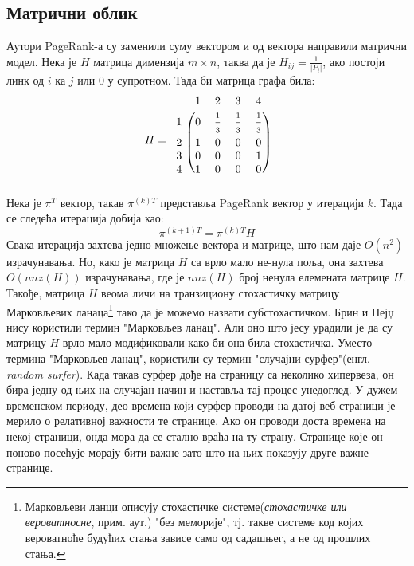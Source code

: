 \documentclass[11pt, serbianc, english, titlepage]{article}
\begin{document}
        \subsection{Матрични облик} 
		Аутори  PageRank-а су заменили суму вектором и од вектора направили матрични модел. Нека је $H$ матрица димензија $m\times n$, таква да је $H_{ij}=\frac{1}{\left |P_{i}  \right |}$, ако постоји линк од $i$ ка $j$ или $0$ у супротном. Тада би матрица графа била: 
\[
H=
\begin{blockarray}{ccccc}
& 1 & 2 & 3 & 4  \\
\begin{block}{c(cccc)}
  1 & 0 & \frac{\strut 1}{\strut 3} & \frac{\strut 1}{\strut 3} & \frac{\strut 1}{\strut 3}  \\
  2 & 1 & 0 & 0 & 0  \\
  3 & 0 & 0 & 0 & 1  \\
  4 & 1 & 0 & 0 & 0  \\
\end{block}
\end{blockarray}
 \]
        Нека је $\pi^{T}$ вектор, такав $\pi^{(k)T}$ представља PageRank вектор у итерацији $k$. Тада се следећа итерација добија као:
        \begin{equation}
        \pi^{(k+1) T}=\pi^{(k)T}H
        \end{equation}
        Свака итерација захтева једно множење вектора и матрице, што нам даје $O(n^{2})$ израчунавања. Но, како је матрица $H$ са врло мало не-нула поља, она захтева $O(nnz(H))$ израчунавања, где је $nnz(H)$ број ненула елемената матрице $H$. Такође, матрица $H$ веома личи на транзициону стохастичку матрицу Марковљевих ланаца\footnote{Марковљеви ланци описују стохастичке системе(\emph{стохастичке или вероватносне}, прим. аут.) "без меморије", тј. такве системе код којих вероватноће будућих стања зависе само од садашњег, а не од прошлих стања.\cite{filipovic2006operatori}} тако да је можемо назвати субстохастичком\cite[Ch 4.2]{langville2011google}. Брин и Пејџ нису користили термин "Марковљев ланац". Али оно што јесу урадили је да су матрицу $H$ врло мало модификовали како би она била стохастичка. Уместо термина "Марковљев ланац", користили су термин "случајни сурфер"(енгл. \emph{random surfer}). Када такав сурфер дође на страницу са неколико хипервеза, он бира једну од њих на случајан начин и наставља тај процес унедоглед. У дужем временском периоду, део времена који сурфер проводи на датој веб страници је мерило о релативној важности те странице. Ако он проводи доста времена на некој страници, онда мора да се стално враћа на ту страну. Странице које он поново посећује морају бити важне зато што на њих показују друге важне странице.\\
\end{document}
